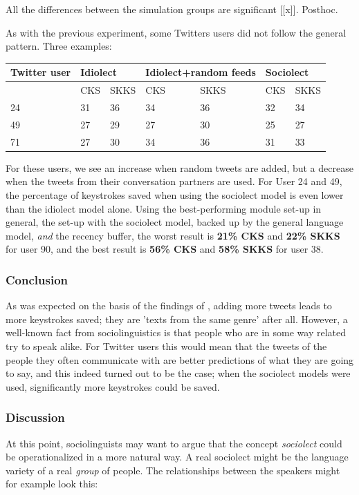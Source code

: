 \documentclass[12pt]{article}
\let\originaltable\table
\let\endoriginaltable\endtable
\renewenvironment{table}[1][ht]{%
  \originaltable[#1]
  \centering}%
  {\endoriginaltable}
\begin{document}
All the differences between the simulation groups are significant [[x]]. Posthoc.

As with the previous experiment, some Twitters users did not follow the general pattern. Three examples:

\begin{table}[H] 
\centering
\begin{tabular}{l|llllll} 
Twitter user&\multicolumn{2}{l}{Idiolect}&\multicolumn{2}{l}{Idiolect+random feeds}&\multicolumn{2}{l}{Sociolect}\\
\hline
&CKS&SKKS&CKS&SKKS&CKS&SKKS\\
24&31&36&34&36&32&34\\
49&27&29&27&30&25&27\\
71&27&30&34&36&31&33\\
\end{tabular} 
\caption{Percentage of keystrokes saved for 3 individual Twitter users, using the the idiolect, control and sociolect models}
\end{table}

For these users, we see an increase when random tweets are added, but a decrease when the tweets from their conversation partners are used. For User 24 and 49, the percentage of keystrokes saved when using the sociolect model is even lower than the idiolect model alone.  Using the best-performing module set-up in general, the set-up with the sociolect model, backed up by the general language model, \emph{and} the recency buffer, the worst result is \textbf{21\% CKS} and \textbf{22\% SKKS} for user 90, and the best result is \textbf{56\% CKS} and \textbf{58\% SKKS} for user 38.

\subsubsection{Conclusion}
As was expected on the basis of the findings of , adding more tweets leads to more keystrokes saved; they are 'texts from the same genre' after all. However, a well-known fact from sociolinguistics is that people who are in some way related try to speak alike. For Twitter users this would mean that the tweets of the people they often communicate with are better predictions of what they are going to say, and this indeed turned out to be the case; when the sociolect models were used, significantly more keystrokes could be saved.


\subsubsection{Discussion}
At this point, sociolinguists may want to argue that the concept \emph{sociolect} could be operationalized in a more natural way. A real sociolect might be the language variety of a real \emph{group} of people. The relationships between the speakers might for example look this:
\end{document}
